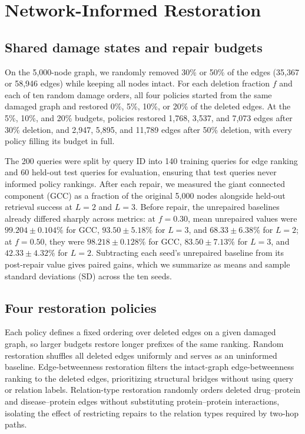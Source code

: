 \section{Network-Informed Restoration}
\label{sec:restoration}

\subsection{Shared damage states and repair budgets}
\label{shared-damage-states-and-repair-budgets}

On the 5,000-node graph, we randomly removed 30\% or 50\% of the edges
(35,367 or 58,946 edges) while keeping all nodes intact. For each deletion
fraction $f$ and each of ten random damage orders, all four policies started
from the same damaged graph and restored 0\%, 5\%, 10\%, or 20\% of the
deleted edges. At the 5\%, 10\%, and 20\% budgets, policies restored 1,768,
3,537, and 7,073 edges after 30\% deletion, and 2,947, 5,895, and 11,789
edges after 50\% deletion, with every policy filling its budget in full.

The 200 queries were split by query ID into 140 training queries for
edge ranking and 60 held-out test queries for evaluation, ensuring that
test queries never informed policy rankings. After each repair, we measured
the giant connected component (GCC) as a fraction of the original 5,000
nodes alongside held-out retrieval success at $L=2$ and $L=3$. Before
repair, the unrepaired baselines already differed sharply across metrics:
at $f=0.30$, mean unrepaired values were $99.204 \pm 0.104\%$ for GCC,
$93.50 \pm 5.18\%$ for $L=3$, and $68.33 \pm 6.38\%$ for $L=2$; at
$f=0.50$, they were $98.218 \pm 0.128\%$ for GCC, $83.50 \pm 7.13\%$ for
$L=3$, and $42.33 \pm 4.32\%$ for $L=2$. Subtracting each seed's unrepaired
baseline from its post-repair value gives paired gains, which we summarize
as means and sample standard deviations (SD) across the ten seeds.

\subsection{Four restoration policies}
\label{four-restoration-policies}

Each policy defines a fixed ordering over deleted edges on a given damaged
graph, so larger budgets restore longer prefixes of the same ranking.
Random restoration shuffles all deleted edges uniformly and serves as an
uninformed baseline. Edge-betweenness restoration filters the intact-graph
edge-betweenness ranking to the deleted edges, prioritizing structural
bridges without using query or relation labels. Relation-type restoration
randomly orders deleted drug--protein and disease--protein edges without
substituting protein--protein interactions, isolating the effect of
restricting repairs to the relation types required by two-hop paths.

